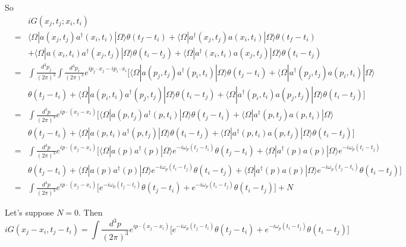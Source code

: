 \documentclass[12pt]{book}
\begin{document}
	So
	\begin{eqnarray}
		&&iG(x_j,t_j;x_i,t_i)\\
		&=&\langle \Omega|a(x_j,t_j)a^\dagger(x_i,t_i)|\Omega\rangle\theta(t_f-t_i)+\langle \Omega|a^\dagger(x_j,t_j)a(x_i,t_i)|\Omega\rangle\theta(t_f-t_i)\nonumber\\
		&&+\langle \Omega|a(x_i,t_i)a^\dagger(x_j,t_j)|\Omega\rangle\theta(t_i-t_j)+\langle \Omega|a^\dagger(x_i,t_i)a(x_j,t_j)|\Omega\rangle\theta(t_i-t_j)\\
		&=&\int\frac{d^3p_j}{(2\pi)^3}\int\frac{d^3p_i}{(2\pi)^3}e^{ip_j\cdot x_j-ip_i\cdot x_i}\big[\langle \Omega|a(p_j,t_j)a^\dagger(p_i,t_i)|\Omega\rangle\theta(t_j-t_i)+\langle \Omega|a^\dagger(p_j,t_j)a(p_i,t_i)|\Omega\rangle\nonumber\\
		&&\theta(t_j-t_i)+\langle \Omega|a(p_i,t_i)a^\dagger(p_j,t_j)|\Omega\rangle\theta(t_i-t_j)+\langle \Omega|a^\dagger(p_i,t_i)a(p_j,t_j)|\Omega\rangle\theta(t_i-t_j)\big]\\
		&=&\int\frac{d^3p}{(2\pi)^3}e^{ip\cdot(x_j-x_i)}\big[\langle \Omega|a(p,t_j)a^\dagger(p,t_i)|\Omega\rangle\theta(t_j-t_i)+\langle \Omega|a^\dagger(p,t_j)a(p,t_i)|\Omega\rangle\nonumber\\
		&&\theta(t_j-t_i)+\langle \Omega|a(p,t_i)a^\dagger(p,t_j)|\Omega\rangle\theta(t_i-t_j)+\langle \Omega|a^\dagger(p,t_i)a(p,t_j)|\Omega\rangle\theta(t_i-t_j)\big]\\
		&=&\int\frac{d^3p}{(2\pi)^3}e^{ip\cdot(x_j-x_i)}\big[\langle \Omega|a(p)a^\dagger(p)|\Omega\rangle e^{-i\omega_p(t_j-t_i)}\theta(t_j-t_i)+\langle \Omega|a^\dagger(p)a(p)|\Omega\rangle e^{-i\omega_p(t_i-t_j)}\nonumber\\
		&&\theta(t_j-t_i)+\langle \Omega|a(p)a^\dagger(p)|\Omega\rangle e^{-i\omega_p(t_i-t_j)}\theta(t_i-t_j)+\langle \Omega|a^\dagger(p)a(p)|\Omega\rangle e^{-i\omega_p(t_j-t_i)}\theta(t_i-t_j)\big]\\
		&=&\int\frac{d^3p}{(2\pi)^3}e^{ip\cdot(x_j-x_i)}\big[e^{-i\omega_p(t_j-t_i)}\theta(t_j-t_i)+ e^{-i\omega_p(t_i-t_j)}\theta(t_i-t_j)\big]+N
	\end{eqnarray}
	
	Let's suppose $N=0$. Then
	\begin{equation}
		iG(x_j-x_i,t_j-t_i)=\int\frac{d^3p}{(2\pi)^3}e^{ip\cdot(x_j-x_i)}\big[e^{-i\omega_p(t_j-t_i)}\theta(t_j-t_i)+ e^{-i\omega_p(t_i-t_j)}\theta(t_i-t_j)\big]
	\end{equation}
	
\end{document}
